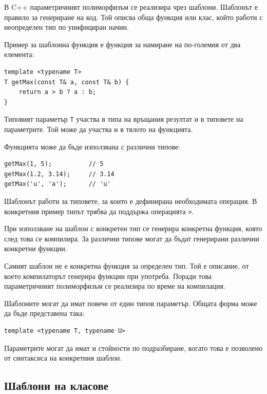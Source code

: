 В C++ параметричният полиморфизъм се реализира чрез шаблони. Шаблонът е правило за генериране на код. Той описва обща функция или клас, който работи с неопределен тип по унифициран начин.

Пример за шаблонна функция е функция за намиране на по-големия от два елемента:

\begin{verbatim}
template <typename T>
T getMax(const T& a, const T& b) {
    return a > b ? a : b;
}
\end{verbatim}

Типовият параметър \texttt{T} участва в типа на връщания резултат и в типовете на параметрите. Той може да участва и в тялото на функцията.

Функцията може да бъде използвана с различни типове:

\begin{verbatim}
getMax(1, 5);          // 5
getMax(1.2, 3.14);     // 3.14
getMax('u', 'a');      // 'u'
\end{verbatim}

Шаблонът работи за типовете, за които е дефинирана необходимата операция. В конкретния пример типът трябва да поддържа операцията \texttt{>}.

\begin{defn}
При използване на шаблон с конкретен тип се генерира конкретна функция, която след това се компилира. За различни типове могат да бъдат генерирани различни конкретни функции.
\end{defn}

Самият шаблон не е конкретна функция за определен тип. Той е описание, от което компилаторът генерира функции при употреба. Поради това параметричният полиморфизъм се реализира по време на компилация.

Шаблоните могат да имат повече от един типов параметър. Общата форма може да бъде представена така:

\begin{verbatim}
template <typename T, typename U>
\end{verbatim}

Параметрите могат да имат и стойности по подразбиране, когато това е позволено от синтаксиса на конкретния шаблон.

\subsection{Шаблони на класове}\label{s:17.5.2}

